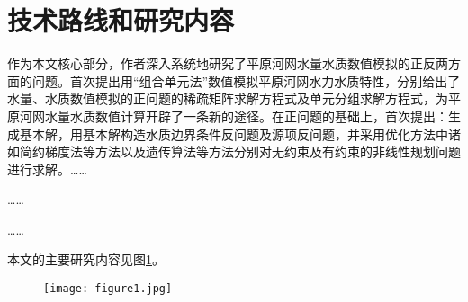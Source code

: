 \section{技术路线和研究内容}
作为本文核心部分，作者深入系统地研究了平原河网水量水质数值模拟的正反两方面的问题。首次提出用“组合单元法”数值模拟平原河网水力水质特性，分别给出了水量、水质数值模拟的正问题的稀疏矩阵求解方程式及单元分组求解方程式，为平原河网水量水质数值计算开辟了一条新的途径。在正问题的基础上，首次提出：生成基本解，用基本解构造水质边界条件反问题及源项反问题，并采用优化方法中诸如简约梯度法等方法以及遗传算法等方法分别对无约束及有约束的非线性规划问题进行求解。……\par
……\par
……\par
本文的主要研究内容见图\ref{fig:maincontents}。

\begin{figure}[H]
	\centering
	\texttt{[image: figure1.jpg]}
	\label{fig:maincontents}
\end{figure}

